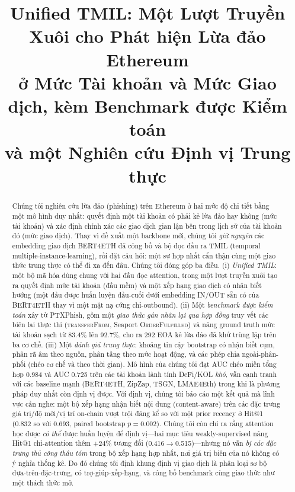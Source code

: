 \documentclass[conference]{IEEEtran}
\begin{document}
\title{Unified TMIL: Một Lượt Truyền Xuôi cho Phát hiện Lừa đảo Ethereum\\
ở Mức Tài khoản và Mức Giao dịch, kèm Benchmark được Kiểm toán\\
và một Nghiên cứu Định vị Trung thực}
\author{}
\maketitle

\begin{abstract}
Chúng tôi nghiên cứu lừa đảo (phishing) trên Ethereum ở hai mức độ chi tiết bằng
một mô hình duy nhất: quyết định một tài khoản có phải kẻ lừa đảo hay không (mức
tài khoản) và xác định chính xác các giao dịch gian lận bên trong lịch sử của tài
khoản đó (mức giao dịch). Thay vì đề xuất một backbone mới, chúng tôi \emph{giữ
nguyên} các embedding giao dịch BERT4ETH đã công bố và bộ đọc đầu ra TMIL (temporal
multiple-instance-learning), rồi đặt câu hỏi: một sự hợp nhất cẩn thận cùng một
giao thức trung thực có thể đi xa đến đâu. Chúng tôi đóng góp ba điều. (i)
\emph{Unified TMIL}: một bộ mã hóa dùng chung với hai đầu đọc attention, trong một
lượt truyền xuôi tạo ra quyết định mức tài khoản (đầu mềm) và một xếp hạng giao
dịch có nhận biết hướng (một đầu được huấn luyện đầu-cuối dưới embedding IN/OUT sẵn
có của BERT4ETH thay vì một mặt nạ cứng chỉ-outbound). (ii) Một \emph{benchmark
được kiểm toán} xây từ PTXPhish, gồm một \emph{giao thức gán nhãn lại qua hợp đồng}
truy vết các biên lai thực thi (\textsc{transferFrom}, Seaport
\textsc{OrderFulfilled}) và nâng ground truth mức tài khoản sạch từ 83.4\% lên
92.7\%, cho ra 292 EOA kẻ lừa đảo đã khử trùng lặp trên ba cơ chế. (iii) Một
\emph{đánh giá trung thực}: khoảng tin cậy bootstrap có nhận biết cụm, phân rã âm
theo nguồn, phân tầng theo mức hoạt động, và các phép chia ngoài-phân-phối (chéo
cơ chế và theo thời gian). Mô hình của chúng tôi đạt AUC chéo miền tổng hợp 0.984
và AUC 0.725 trên các tài khoản lành tính DeFi/KOL \emph{khó}, vẫn cạnh tranh với
các baseline mạnh (BERT4ETH, ZipZap, TSGN, LMAE4Eth) trong khi là phương pháp duy
nhất còn định vị được. Với định vị, chúng tôi báo cáo một kết quả mà lĩnh vực cần
nghe: một bộ xếp hạng nhận biết nội dung (content-aware) trên các đặc trưng
giá trị/độ mới/vị trí on-chain vượt trội đáng kể so với một prior recency ở Hit@1
(0.832 so với 0.693, paired bootstrap $p{=}0.002$). Chúng tôi còn chỉ ra rằng
attention học được \emph{có thể} được huấn luyện để định vị---hai mục tiêu
weakly-supervised nâng Hit@1 chỉ-attention thêm $+24\%$ tương đối
(0.416$\rightarrow$0.515)---nhưng nó vẫn \emph{bị các đặc trưng thủ công thâu tóm}
trong bộ xếp hạng hợp nhất, nơi giá trị biên của nó không có ý nghĩa thống kê. Do đó
chúng tôi định khung định vị giao dịch là phân loại sơ bộ dựa-trên-đặc-trưng, có
trợ-giúp-xếp-hạng, và công bố benchmark cùng giao thức như một
thách thức mở.
\end{abstract}
\end{document}
